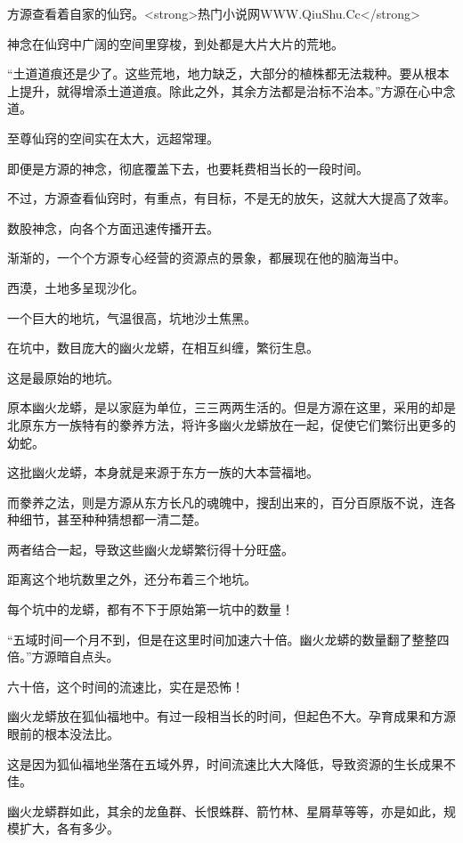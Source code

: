 
\begin{this_body}

方源查看着自家的仙窍。<strong>热门小说网WWW.QiuShu.Cc</strong>

神念在仙窍中广阔的空间里穿梭，到处都是大片大片的荒地。

“土道道痕还是少了。这些荒地，地力缺乏，大部分的植株都无法栽种。要从根本上提升，就得增添土道道痕。除此之外，其余方法都是治标不治本。”方源在心中念道。

至尊仙窍的空间实在太大，远超常理。

即便是方源的神念，彻底覆盖下去，也要耗费相当长的一段时间。

不过，方源查看仙窍时，有重点，有目标，不是无的放矢，这就大大提高了效率。

数股神念，向各个方面迅速传播开去。

渐渐的，一个个方源专心经营的资源点的景象，都展现在他的脑海当中。

西漠，土地多呈现沙化。

一个巨大的地坑，气温很高，坑地沙土焦黑。

在坑中，数目庞大的幽火龙蟒，在相互纠缠，繁衍生息。

这是最原始的地坑。

原本幽火龙蟒，是以家庭为单位，三三两两生活的。但是方源在这里，采用的却是北原东方一族特有的豢养方法，将许多幽火龙蟒放在一起，促使它们繁衍出更多的幼蛇。

这批幽火龙蟒，本身就是来源于东方一族的大本营福地。

而豢养之法，则是方源从东方长凡的魂魄中，搜刮出来的，百分百原版不说，连各种细节，甚至种种猜想都一清二楚。

两者结合一起，导致这些幽火龙蟒繁衍得十分旺盛。

距离这个地坑数里之外，还分布着三个地坑。

每个坑中的龙蟒，都有不下于原始第一坑中的数量！

“五域时间一个月不到，但是在这里时间加速六十倍。幽火龙蟒的数量翻了整整四倍。”方源暗自点头。

六十倍，这个时间的流速比，实在是恐怖！

幽火龙蟒放在狐仙福地中。有过一段相当长的时间，但起色不大。孕育成果和方源眼前的根本没法比。

这是因为狐仙福地坐落在五域外界，时间流速比大大降低，导致资源的生长成果不佳。

幽火龙蟒群如此，其余的龙鱼群、长恨蛛群、箭竹林、星屑草等等，亦是如此，规模扩大，各有多少。


\end{this_body}

